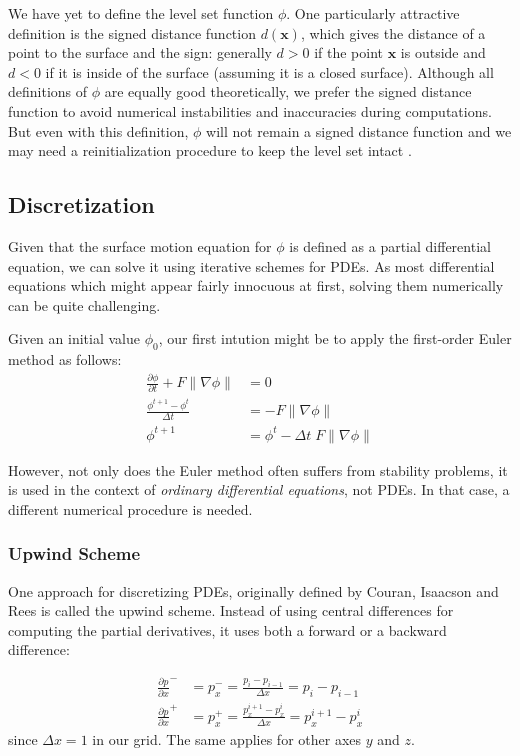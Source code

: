 \documentclass{article}
\begin{document}
We have yet to define the level set function $\phi$. One particularly
attractive definition is the signed distance function $d(\mathbf{x})$, which
gives the distance of a point to the surface and the sign: generally $d > 0$
if the point $\mathbf{x}$ is outside and $d < 0$ if it is inside of the
surface (assuming it is a closed surface). Although all definitions of $\phi$
are equally good theoretically, we prefer the signed distance function to
avoid numerical instabilities and inaccuracies during computations. But even
with this definition, $\phi$ will not remain a signed distance function and we
may need a reinitialization procedure to keep the level set intact
\cite{peng1999pde}.

\subsection{Discretization}

Given that the surface motion equation for $\phi$ is defined as a partial
differential equation, we can solve it using iterative schemes for PDEs. As most
differential equations which might appear fairly innocuous at first, solving
them numerically can be quite challenging.

Given an initial value $\phi_0$, our first intution might be to apply the
first-order Euler method as follows:
\begin{align}
  \frac{\partial \phi}{\partial t} + F \|\nabla \phi\| &= 0 \\
  \frac{\phi^{t+1} - \phi^{t}}{\Delta t} &=  -F \|\nabla \phi\| \\
  \phi^{t+1} &= \phi^{t} - \Delta t \; F \|\nabla \phi\| 
\end{align}

However, not only does the Euler method often suffers from stability problems,
it is used in the context of \textit{ordinary differential equations}, not PDEs.
In that case, a different numerical procedure is needed. 

\subsubsection{Upwind Scheme}
One approach for discretizing PDEs, originally defined by Couran, Isaacson and
Rees \cite{courant1952solution} is called the upwind scheme. Instead of using
central differences for computing the partial derivatives, it uses both a
forward or a backward difference:

\begin{align}
    \frac{\partial p}{\partial x}^{-} &= p^{-}_x = \frac{p_i -
    p_{i-1}}{ \Delta x} = p_i - p_{i-1} \\
    \frac{\partial p}{\partial x}^{+} &= p^{+}_x = \frac{p^{i+1}_x -
    p^i_x}{ \Delta x} = p^{i+1}_x - p^i_x  
\end{align} since $ \Delta x = 1 $ in our grid. The same applies for other axes
$y$ and $z$.
\end{document}
